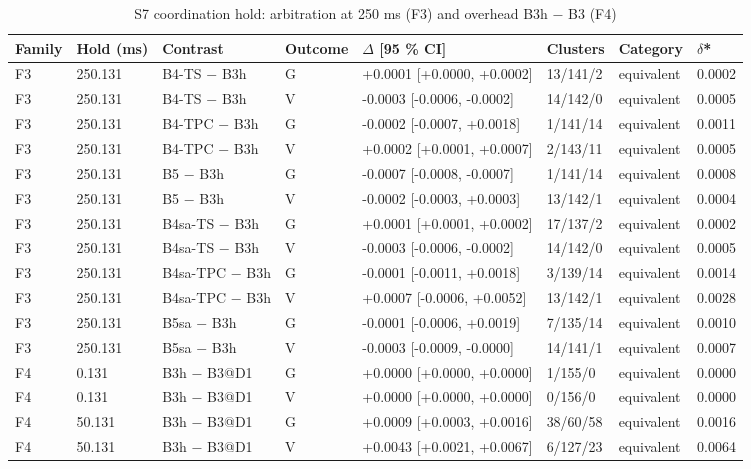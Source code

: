 \begin{table}[t]\centering\caption{S7 coordination hold: arbitration at 250 ms (F3) and overhead B3h $-$ B3 (F4)}\label{tab:t3}\footnotesize
\begin{tabular}{llllllll}\toprule
Family & Hold (ms) & Contrast & Outcome & $\Delta$ [95 \% CI] & Clusters & Category & $\delta$* \\\midrule
F3 & 250.131 & B4-TS $-$ B3h & G & +0.0001 [+0.0000, +0.0002] & 13/141/2 & equivalent & 0.0002 \\
F3 & 250.131 & B4-TS $-$ B3h & V & -0.0003 [-0.0006, -0.0002] & 14/142/0 & equivalent & 0.0005 \\
F3 & 250.131 & B4-TPC $-$ B3h & G & -0.0002 [-0.0007, +0.0018] & 1/141/14 & equivalent & 0.0011 \\
F3 & 250.131 & B4-TPC $-$ B3h & V & +0.0002 [+0.0001, +0.0007] & 2/143/11 & equivalent & 0.0005 \\
F3 & 250.131 & B5 $-$ B3h & G & -0.0007 [-0.0008, -0.0007] & 1/141/14 & equivalent & 0.0008 \\
F3 & 250.131 & B5 $-$ B3h & V & -0.0002 [-0.0003, +0.0003] & 13/142/1 & equivalent & 0.0004 \\
F3 & 250.131 & B4sa-TS $-$ B3h & G & +0.0001 [+0.0001, +0.0002] & 17/137/2 & equivalent & 0.0002 \\
F3 & 250.131 & B4sa-TS $-$ B3h & V & -0.0003 [-0.0006, -0.0002] & 14/142/0 & equivalent & 0.0005 \\
F3 & 250.131 & B4sa-TPC $-$ B3h & G & -0.0001 [-0.0011, +0.0018] & 3/139/14 & equivalent & 0.0014 \\
F3 & 250.131 & B4sa-TPC $-$ B3h & V & +0.0007 [-0.0006, +0.0052] & 13/142/1 & equivalent & 0.0028 \\
F3 & 250.131 & B5sa $-$ B3h & G & -0.0001 [-0.0006, +0.0019] & 7/135/14 & equivalent & 0.0010 \\
F3 & 250.131 & B5sa $-$ B3h & V & -0.0003 [-0.0009, -0.0000] & 14/141/1 & equivalent & 0.0007 \\
F4 & 0.131 & B3h $-$ B3@D1 & G & +0.0000 [+0.0000, +0.0000] & 1/155/0 & equivalent & 0.0000 \\
F4 & 0.131 & B3h $-$ B3@D1 & V & +0.0000 [+0.0000, +0.0000] & 0/156/0 & equivalent & 0.0000 \\
F4 & 50.131 & B3h $-$ B3@D1 & G & +0.0009 [+0.0003, +0.0016] & 38/60/58 & equivalent & 0.0016 \\
F4 & 50.131 & B3h $-$ B3@D1 & V & +0.0043 [+0.0021, +0.0067] & 6/127/23 & equivalent & 0.0064 \\

\end{tabular}
\end{table}
